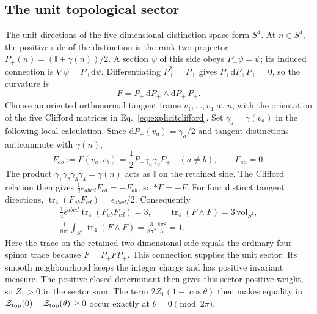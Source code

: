 \documentclass[aps,prx,onecolumn,10pt,notitlepage,nofootinbib,longbibliography]{revtex4-2}
\numberwithin{equation}{section}
\numberwithin{table}{section}
\newcommand{\Id}{\mathbb I}
\newcommand{\tr}{\operatorname{tr}}
\newcommand{\dd}{\mathrm d}
\begin{document}
\subsection{The unit topological sector}
\label{sec:unittopologicalsector}

The unit directions of the five-dimensional distinction space form
$S^4$. At $n\in S^4$, the positive side of the distinction is the
rank-two projector
$P_+(n)=(\Id+\gamma(n))/2$.
A section $\psi$ of this side obeys $P_+\psi=\psi$; its induced
connection is $\nabla\psi=P_+\dd\psi$.
Differentiating $P_+^2=P_+$ gives
$P_+\dd P_+P_+=0$, so the curvature is
\begin{equation}
 F=P_+\,\dd P_+\wedge\dd P_+\,P_+.
 \label{eq:projectorcurvature}
\end{equation}
Choose an oriented orthonormal tangent frame
$v_1,\ldots,v_4$ at $n$, with the orientation of the five Clifford
matrices in Eq.~\eqref{eq:explicitclifford}. Set
$\gamma_a=\gamma(v_a)$ in the following local calculation.
Since $\dd P_+(v_a)=\gamma_a/2$ and tangent distinctions
anticommute with $\gamma(n)$,
\begin{equation}
 F_{ab}:=F(v_a,v_b)
 =\frac12P_+\gamma_a\gamma_bP_+\quad(a\ne b),
 \qquad F_{aa}=0.
 \label{eq:unitsectorcurvature}
\end{equation}
The product $\gamma_1\gamma_2\gamma_3\gamma_4=\gamma(n)$
acts as $\Id$ on the retained side. The Clifford relation then gives
$\tfrac12\epsilon_{abcd}F_{cd}=-F_{ab}$, so $*F=-F$.
For four distinct tangent directions,
$\tr_4(F_{ab}F_{cd})=\epsilon_{abcd}/2$.
Consequently
\begin{equation}
 \begin{gathered}
 \frac14\epsilon^{abcd}\tr_4(F_{ab}F_{cd})=3,
 \qquad \tr_4(F\wedge F)=3\,\mathrm{vol}_{S^4},\\
 \frac1{8\pi^2}\int_{S^4}\tr_4(F\wedge F)
 =\frac{3}{8\pi^2}\frac{8\pi^2}{3}=1.
 \end{gathered}
 \label{eq:unitsectornumber}
\end{equation}
Here the trace on the retained two-dimensional side equals the
ordinary four-spinor trace because $F=P_+FP_+$.
This connection supplies the unit sector. Its smooth neighbourhood keeps the integer charge and has positive invariant measure. The positive closed
determinant then gives this sector positive weight, so $Z_1>0$ in the sector sum.
The term $2Z_1(1-\cos\theta)$ then makes equality in
$\mathcal Z_{\rm top}(0)-\mathcal Z_{\rm top}(\theta)\geq0$
occur exactly at $\theta=0\pmod{2\pi}$.
\end{document}
